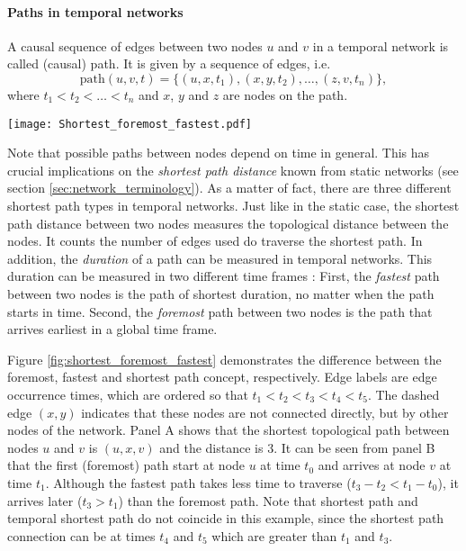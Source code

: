 \paragraph{Paths in temporal networks\color{Cayenne}{.}}
A causal sequence of edges between two nodes $u$ and $v$ in a temporal network is called (causal) path.
It is given by a sequence of edges, i.e.
\[
\mathrm{path}(u,v,t)= \{ (u,x,t_1),(x,y,t_2),\dots ,(z,v,t_n) \}, 
\]
where $ t_1<t_2<\dots <t_n$ and $x$, $y$ and $z$ are nodes on the path.
\begin{SCfigure}
\texttt{[image: Shortest\_foremost\_fastest.pdf]}
\caption{Topological shortest distance and temporal shortest durations for a path between nodes $u$ and $v$.
The shortest path (panel A) counts the number of edges between the nodes.
Panel~B demonstrates that although the fastest path could take $t_3-t_2 < t_1-t_0$, the foremost path arrives already at $t_1<t_2$.
}
\label{fig:shortest_foremost_fastest}
\end{SCfigure}

Note that possible paths between nodes depend on time in general.
This has crucial implications on the \emph{shortest path distance} known from static networks (see section  \ref{sec:network_terminology}).
As a matter of fact, there are three different shortest path types in temporal networks.
Just like in the static case, the shortest path distance between two nodes measures the topological distance between the nodes.
It counts the number of edges used do traverse the shortest path.
In addition, the \emph{duration} of a path can be measured in temporal networks.
This duration can be measured in two different time frames \citep{Casteights_review}:
First, the \emph{fastest} path between two nodes is the path of shortest duration, no matter when the path starts in time.
Second, the \emph{foremost} path between two nodes is the path that arrives earliest in a global time frame.

Figure \ref{fig:shortest_foremost_fastest} demonstrates the difference between the foremost, fastest and shortest path concept, respectively.
Edge labels are edge occurrence times, which are ordered so that $t_1<t_2<t_3<t_4<t_5$.
The dashed edge $(x,y)$ indicates that these nodes are not connected directly, but by other nodes of the network.
Panel A shows that the shortest topological path between nodes $u$ and $v$ is $(u,x,v)$ and the distance is $3$.
It can be seen from panel B that the first (foremost) path start at node $u$ at time $t_0$ and arrives at node $v$ at time $t_1$.
Although the fastest path takes less time to traverse ($t_3-t_2<t_1-t_0$), it arrives later ($t_3>t_1$) than the foremost path.
Note that shortest path and temporal shortest path do not coincide in this example, since the shortest path connection can be at times $t_4$ and $t_5$ which are greater than $t_1$ and $t_3$.

